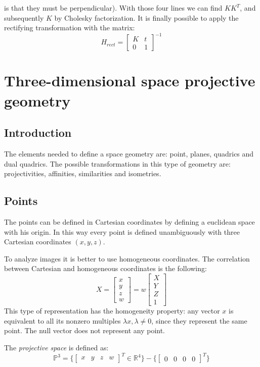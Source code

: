\documentclass[12pt, a4paper]{report}
\begin{document}
\begin{enumerate}
\begin{itemize}
                    is that they must be perpendicular). With those four lines we can find $KK^T$, and subsequently $K$ by Cholesky factorization. It is finally possible 
                    to apply the rectifying transformation with the matrix: 
                    \[H_{rect}=\begin{bmatrix}
                        K & t \\ 
                        0 & 1
                    \end{bmatrix}^{-1}\] 
            \end{itemize}
    \end{enumerate}

\newpage

\chapter{Three-dimensional space projective geometry}
    \section{Introduction}
    The elements needed to define a space geometry are: point, planes, quadrics and dual quadrics. The possible transformations in this type of geometry are: projectivities, 
    affinities, similarities and isometries. 

    \section{Points}
    The points can be defined in Cartesian coordinates by defining a euclidean space with his origin. In this way every point is defined unambiguously with three Cartesian 
    coordinates $(x,y,z)$. 

    To analyze images it is better to use homogeneous coordinates. The correlation between Cartesian and homogeneous coordinates is the following: 
    \[
    X =
    \begin{bmatrix}
        x \\
        y \\
        z \\
        w
    \end{bmatrix}
    =w
    \begin{bmatrix}
        X \\
        Y \\
        Z \\
        1 
    \end{bmatrix}
    \]
    This type of representation has the homogeneity property: any vector $x$ is equivalent to all its nonzero multiples $\lambda x, \lambda \neq 0$, since they represent 
    the same point. The null vector does not represent any point.
    \begin{definition}
        The \emph{projective space} is defined as:
        \[\mathbb{P}^3=\{{\begin{bmatrix} x & y & z & w \end{bmatrix}}^T \in \mathbb{R}^4\}-\{{\begin{bmatrix} 0 & 0 & 0 & 0 \end{bmatrix}}^T\}\]
    \end{definition}
\end{document}
